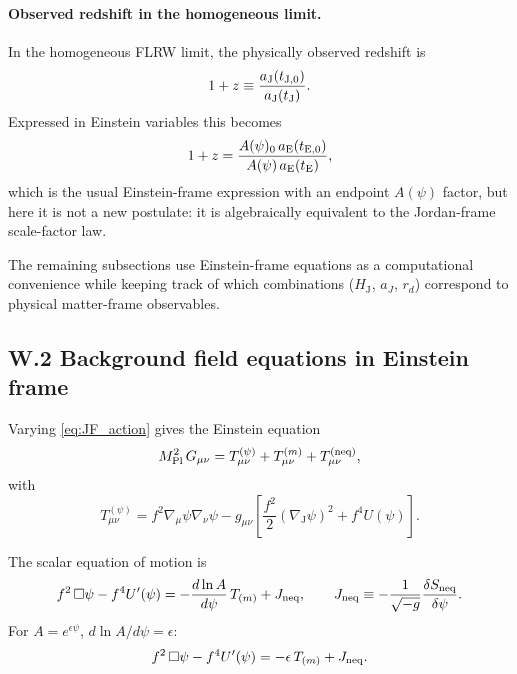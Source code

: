 \documentclass[10pt]{article}
\newcommand{\aJ}{a_{\mathrm{J}}}
\newcommand{\aE}{a_{\mathrm{E}}}
\newcommand{\HJ}{H_{\mathrm{J}}}
\newcommand{\Apsi}{A(\psi)}
\begin{document}
\paragraph{Observed redshift in the homogeneous limit.}
In the homogeneous FLRW limit, the physically observed redshift is
\begin{equation}
1+z \equiv \frac{\aJ(t_{{\rm J},0})}{\aJ(t_{\rm J})}.
\end{equation}
Expressed in Einstein variables this becomes
\begin{equation}
1+z = \frac{\Apsi_0\,\aE(t_{{\rm E},0})}{\Apsi\,\aE(t_{\rm E})},
\label{eq:W_zobs_general}
\end{equation}
which is the usual Einstein-frame expression with an endpoint \(\Apsi\) factor, but here it is not a
new postulate: it is algebraically equivalent to the Jordan-frame scale-factor law.

The remaining subsections use Einstein-frame equations as a computational convenience while keeping
track of which combinations (\(\HJ\), \(a_J\), \(r_d\)) correspond to physical matter-frame observables.

\subsection{W.2 Background field equations in Einstein frame}
\label{app:early_universe:einstein_background}

Varying \eqref{eq:JF_action} gives the Einstein equation
\begin{equation}
M_{\rm Pl}^2\,G_{\mu\nu}
=
T^{(\psi)}_{\mu\nu} + T^{(m)}_{\mu\nu} + T^{(\rm neq)}_{\mu\nu},
\label{eq:W_einstein_eq}
\end{equation}
with
\begin{equation}
T^{(\psi)}_{\mu\nu}
=
f^2\nabla_\mu\psi\nabla_\nu\psi
-
g_{\mu\nu}\left[\frac{f^2}{2}(\nabla_{\mathrm{J}}\psi)^2 + f^4U(\psi)\right].
\label{eq:W_Tpsi}
\end{equation}

The scalar equation of motion is
\begin{equation}
f^2\,\Box\psi - f^4U'(\psi)
=
-\frac{d\ln A}{d\psi}\,T_{(m)} + J_{\rm neq},
\qquad
J_{\rm neq}\equiv -\frac{1}{\sqrt{-g}}\frac{\delta S_{\rm neq}}{\delta\psi}.
\label{eq:W_scalar_eom}
\end{equation}
For $A=e^{\epsilon\psi}$, $d\ln A/d\psi=\epsilon$:
\begin{equation}
f^2\,\Box\psi - f^4U'(\psi)
=
-\epsilon\,T_{(m)} + J_{\rm neq}.
\label{eq:W_scalar_eom_eps}
\end{equation}
\end{document}

